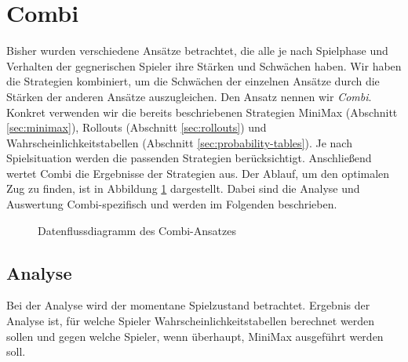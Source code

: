 \documentclass[12pt,a4paper]{article}
\begin{document}
\section{Combi}

Bisher wurden verschiedene Ansätze betrachtet, die alle je nach Spielphase und Verhalten der gegnerischen Spieler ihre Stärken und Schwächen haben. Wir haben die Strategien kombiniert, um die Schwächen der einzelnen Ansätze durch die Stärken der anderen Ansätze auszugleichen. Den Ansatz nennen wir \textit{Combi}.
Konkret verwenden wir die bereits beschriebenen Strategien MiniMax (Abschnitt \ref{sec:minimax}), Rollouts (Abschnitt \ref{sec:rollouts}) und Wahrscheinlichkeitstabellen (Abschnitt \ref{sec:probability-tables}). Je nach Spielsituation werden die passenden Strategien berücksichtigt. Anschließend wertet Combi die Ergebnisse der Strategien aus. Der Ablauf, um den optimalen Zug zu finden, ist in Abbildung \ref{fig:data-flow-diagram} dargestellt. Dabei sind die Analyse und Auswertung Combi-spezifisch und werden im Folgenden beschrieben.

\begin{figure}[h]
    \centering
    \caption{Datenflussdiagramm des Combi-Ansatzes}
    \label{fig:data-flow-diagram}
\end{figure}
\newpage
\subsection{Analyse} \label{sec:combi-analyse}
Bei der Analyse wird der momentane Spielzustand betrachtet. Ergebnis der Analyse ist, für welche Spieler Wahrscheinlichkeitstabellen berechnet werden sollen und gegen welche Spieler, wenn überhaupt, MiniMax ausgeführt werden soll. 
\end{document}
